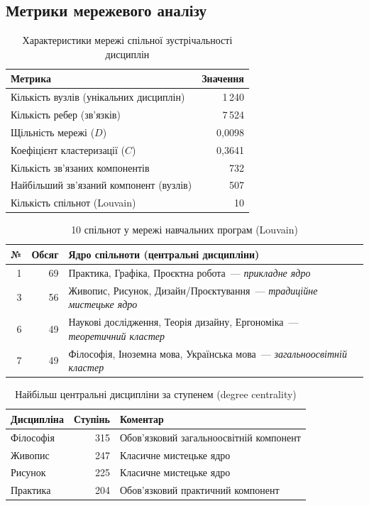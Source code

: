 \subsection{Метрики мережевого аналізу}

\begin{table}[htbp]
\centering
\caption{Характеристики мережі спільної зустрічальності дисциплін}\label{tab:app-network-metrics}
\small
\begin{tabularx}{\textwidth}{@{}Xr@{}}
\toprule
\textbf{Метрика} & \textbf{Значення} \\
\midrule
Кількість вузлів (унікальних дисциплін) & 1\,240 \\
Кількість ребер (зв'язків) & 7\,524 \\
Щільність мережі ($D$) & 0,0098 \\
Коефіцієнт кластеризації ($C$) & 0,3641 \\
Кількість зв'язаних компонентів & 732 \\
Найбільший зв'язаний компонент (вузлів) & 507 \\
Кількість спільнот (Louvain) & 10 \\
\bottomrule
\end{tabularx}
\end{table}

\begin{table}[htbp]
\centering
\caption{10 спільнот у мережі навчальних програм (Louvain)}\label{tab:app-communities}
\small
\begin{tabularx}{\textwidth}{@{}rrX@{}}
\toprule
\textbf{№} & \textbf{Обсяг} & \textbf{Ядро спільноти (центральні дисципліни)} \\
\midrule
1 & 69 & Практика, Графіка, Проєктна робота~--- \textit{прикладне ядро} \\
3 & 56 & Живопис, Рисунок, Дизайн/Проєктування~--- \textit{традиційне мистецьке ядро} \\
6 & 49 & Наукові дослідження, Теорія дизайну, Ергономіка~--- \textit{теоретичний кластер} \\
7 & 49 & Філософія, Іноземна мова, Українська мова~--- \textit{загальноосвітній кластер} \\
\bottomrule
\end{tabularx}
\end{table}

\begin{table}[htbp]
\centering
\caption{Найбільш центральні дисципліни за ступенем (degree centrality)}\label{tab:app-centrality}
\small
\begin{tabularx}{\textwidth}{@{}Xrl@{}}
\toprule
\textbf{Дисципліна} & \textbf{Ступінь} & \textbf{Коментар} \\
\midrule
Філософія & 315 & Обов'язковий загальноосвітній компонент \\
Живопис & 247 & Класичне мистецьке ядро \\
Рисунок & 225 & Класичне мистецьке ядро \\
Практика & 204 & Обов'язковий практичний компонент \\
\bottomrule
\end{tabularx}
\end{table}

